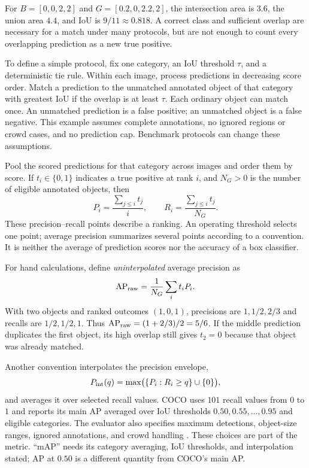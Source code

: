 For $B=[0,0,2,2]$ and $G=[0.2,0,2.2,2]$, the intersection area is $3.6$, the union area $4.4$, and IoU is $9/11\approx0.818$. A correct class and sufficient overlap are necessary for a match under many protocols, but are not enough to count every overlapping prediction as a new true positive.

To define a simple protocol, fix one category, an IoU threshold $\tau$, and a deterministic tie rule. Within each image, process predictions in decreasing score order. Match a prediction to the unmatched annotated object of that category with greatest IoU if the overlap is at least $\tau$. Each ordinary object can match once. An unmatched prediction is a false positive; an unmatched object is a false negative. This example assumes complete annotations, no ignored regions or crowd cases, and no prediction cap. Benchmark protocols can change these assumptions.

Pool the scored predictions for that category across images and order them by score. If $t_i\in\{0,1\}$ indicates a true positive at rank $i$, and $N_G>0$ is the number of eligible annotated objects, then
\[
P_i=\frac{\sum_{j\le i}t_j}{i},\qquad
R_i=\frac{\sum_{j\le i}t_j}{N_G}.
\]
These precision--recall points describe a ranking. An operating threshold selects one point; average precision summarizes several points according to a convention. It is neither the average of prediction scores nor the accuracy of a box classifier.

For hand calculations, define \emph{uninterpolated} average precision as
\[
\operatorname{AP}_{\rm raw}=\frac1{N_G}\sum_i t_iP_i.
\]
With two objects and ranked outcomes $(1,0,1)$, precisions are $1,1/2,2/3$ and recalls are $1/2,1/2,1$. Thus $\operatorname{AP}_{\rm raw}=(1+2/3)/2=5/6$. If the middle prediction duplicates the first object, its high overlap still gives $t_2=0$ because that object was already matched.

Another convention interpolates the precision envelope,
\[
P_{\rm int}(q)=\max\bigl(\{P_i:R_i\ge q\}\cup\{0\}\bigr),
\]
and averages it over selected recall values. COCO uses $101$ recall values from $0$ to $1$ and reports its main AP averaged over IoU thresholds $0.50,0.55,\ldots,0.95$ and eligible categories. The evaluator also specifies maximum detections, object-size ranges, ignored annotations, and crowd handling \citep{coco2015evaluation}. These choices are part of the metric. ``mAP'' needs its category averaging, IoU thresholds, and interpolation stated; AP at $0.50$ is a different quantity from COCO's main AP.

